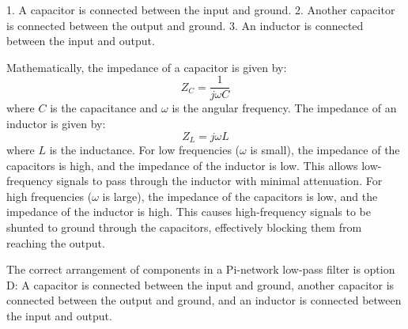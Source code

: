 1. A capacitor is connected between the input and ground.
2. Another capacitor is connected between the output and ground.
3. An inductor is connected between the input and output.

Mathematically, the impedance of a capacitor is given by:
\[
Z_C = \frac{1}{j\omega C}
\]
where $C$ is the capacitance and $\omega$ is the angular frequency. The impedance of an inductor is given by:
\[
Z_L = j\omega L
\]
where $L$ is the inductance. For low frequencies ($\omega$ is small), the impedance of the capacitors is high, and the impedance of the inductor is low. This allows low-frequency signals to pass through the inductor with minimal attenuation. For high frequencies ($\omega$ is large), the impedance of the capacitors is low, and the impedance of the inductor is high. This causes high-frequency signals to be shunted to ground through the capacitors, effectively blocking them from reaching the output.

The correct arrangement of components in a Pi-network low-pass filter is option D: A capacitor is connected between the input and ground, another capacitor is connected between the output and ground, and an inductor is connected between the input and output.

